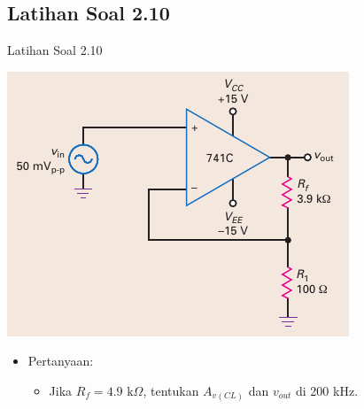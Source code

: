 \subsection{Latihan Soal 2.10}
\begin{frame}{Latihan Soal 2.10}
	\begin{multicols}{2}
		\begin{center}
			\includegraphics[width=\linewidth]{gambar/fig-16.22a}
		\end{center}
		\columnbreak
		\begin{itemize}
			\item Pertanyaan:
			\begin{itemize}
				\item Jika $ R_f = 4.9 \text{ k}\Omega $, tentukan $ A_{v(CL)} $ dan $ v_{out} $ di 200 kHz.
			\end{itemize}
		\end{itemize}
	\end{multicols}
\end{frame}

